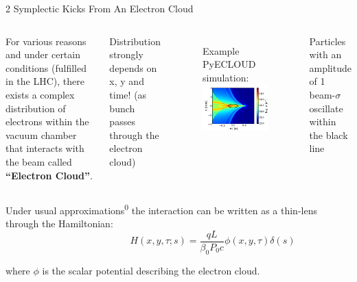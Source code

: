 \documentclass{beamer}
\begin{document}

\begin{frame}{2 Symplectic Kicks From An Electron Cloud}
\begin{columns}
For various reasons and under certain conditions (fulfilled in the LHC), there exists a complex distribution of electrons within the vacuum chamber that interacts with the beam called \textbf{``{\color{blue}Electron Cloud}''}.

Distribution {\color{red}strongly depends on x, y and time!} (as bunch passes through the electron cloud)

\begin{figure}
    \footnotesize
    Example PyECLOUD simulation:
    \centering
    \includegraphics[width=\textwidth]{kostas_figs/rho_pinch_beam_sigma.png}
\end{figure}
\vspace{-0.4cm}
    \hfill \tiny Particles with an amplitude of 1 beam-$\sigma$  \\ \hfill  oscillate within the black line
    
\normalsize
 
\end{columns}
\vspace{0.1cm}
Under usual approximations\textsuperscript{0} the interaction can be written as a {\color{blue}thin-lens through the Hamiltonian}: 
\vspace{-0.7cm}
\begin{equation*}\hspace{3cm}
    H(x,y,\tau;s) = 
    \frac{qL}{\beta_0 P_0 c}
    \phi \left(x,y,\tau\right) \delta (s)
\end{equation*}
\vspace{-0.5cm}

where $\phi$ is the scalar potential describing the electron cloud.

\end{frame}
\end{document}
